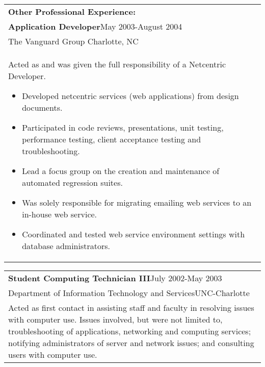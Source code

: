 \documentclass[12pt]{report}
\newenvironment{detailsList}
{\begin{itemize}
  \setlength{\itemsep}{1pt}
  \setlength{\parskip}{0pt}
  \setlength{\parsep}{0pt}
  \setlength{\partopsep}{0pt}
  \setlength{\topsep}{0pt}}
{\end{itemize}}
\def\fullLength{6.5in}
\begin{document}
\begin{table}[!h]
\begin{tabular}{p{\fullLength}}
\textbf{\Large Other Professional Experience:}\\
\textbf{Application Developer}\hfill May 2003-August 2004\\
The Vanguard Group \hfill Charlotte, NC\\
Acted as and was given the full responsibility of a Netcentric Developer.
\begin{detailsList}
\item Developed netcentric services (web applications) from design documents.
\item Participated in code reviews, presentations, unit testing, performance testing, client acceptance testing and troubleshooting.
\item Lead a focus group on the creation and maintenance of automated regression suites.
\item Was solely responsible for migrating emailing web services to an in-house web service.
\item Coordinated and tested web service environment settings with database administrators.
\end{detailsList}
\end{tabular}
\end{table}

\begin{table}[!h]
\begin{tabular}{p{\fullLength}}
\textbf{Student Computing Technician III}\hfill July 2002-May 2003\\
Department of Information Technology and Services\hfill UNC-Charlotte\\
Acted as first contact in assisting staff and faculty in resolving issues with computer use. Issues involved, but were not limited to, troubleshooting of applications, networking and computing services; notifying administrators of server and network issues; and consulting users with computer use.
\end{tabular}
\end{table}

\clearpage
\end{document}
